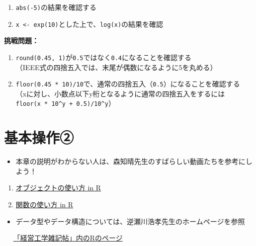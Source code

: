 \documentclass[
]{book}
\providecommand{\tightlist}{%
  \setlength{\itemsep}{0pt}\setlength{\parskip}{0pt}}
\begin{document}
\begin{enumerate}
\def\labelenumi{\arabic{enumi}.}
\tightlist
\item
  \texttt{abs(-5)}の結果を確認する
\item
  \texttt{x\ \textless{}-\ exp(10)}とした上で、\texttt{log(x)}の結果を確認
\end{enumerate}

\textbf{挑戦問題：}

\begin{enumerate}
\def\labelenumi{\arabic{enumi}.}
\tightlist
\item
  \texttt{round(0.45,\ 1)}が\texttt{0.5}ではなく\texttt{0.4}になることを確認する\\
  （IEEE式の四捨五入では、末尾が偶数になるように5を丸める）
\item
  \texttt{floor(0.45\ *\ 10)/10}で、通常の四捨五入（\texttt{0.5}）になることを確認する\\
  （xに対し、小数点以下y桁となるように通常の四捨五入をするには\texttt{floor(x\ *\ 10\^{}y\ +\ 0.5)/10\^{}y}）
\end{enumerate}

\hypertarget{ux57faux672cux64cdux4f5cux2461}{%
\chapter{基本操作②}\label{ux57faux672cux64cdux4f5cux2461}}

\begin{itemize}
\tightlist
\item
  本章の説明がわからない人は、森知晴先生のすばらしい動画たちを参考にしよう！
\end{itemize}

\begin{enumerate}
\def\labelenumi{\arabic{enumi}.}
\tightlist
\item
  \href{https://youtu.be/CblsIBlzqX0}{オブジェクトの使い方 in R}\\
\item
  \href{https://youtu.be/q8MI6P2hoUM}{関数の使い方 in R}
\end{enumerate}

\begin{itemize}
\tightlist
\item
  データ型やデータ構造については、逆瀬川浩孝先生のホームページを参照
\end{itemize}

　 \href{http://www.f.waseda.jp/sakas/R/index.html}{「経営工学雑記帖」内のRのページ}
\end{document}
